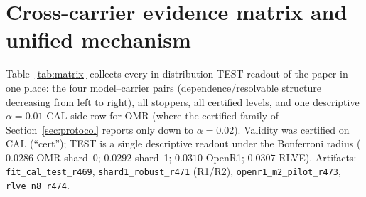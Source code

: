 \documentclass{article}
\theoremstyle{definition}
\theoremstyle{remark}
\begin{document}
\section{Cross-carrier evidence matrix and unified mechanism}
\label{app:matrix}
Table~\ref{tab:matrix} collects every in-distribution TEST readout of the
paper in one place: the four model--carrier pairs (dependence/resolvable
structure decreasing from left to right), all stoppers, all certified
levels, and one descriptive $\alpha{=}0.01$ CAL-side row for OMR (where
the certified family of Section~\ref{sec:protocol} reports only down to
$\alpha{=}0.02$). Validity was certified on CAL (``cert''); TEST is a
single descriptive readout under the Bonferroni radius
($0.0286$ OMR shard~0; $0.0292$ shard~1; $0.0310$ OpenR1; $0.0307$ RLVE).
Artifacts: \texttt{fit\_cal\_test\_r469}, \texttt{shard1\_robust\_r471}
(R1/R2), \texttt{openr1\_m2\_pilot\_r473}, \texttt{rlve\_n8\_r474}.
\end{document}
